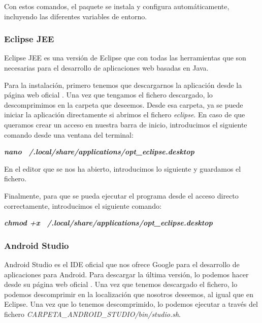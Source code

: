 Con estos comandos, el paquete se instala y configura automáticamente, incluyendo las diferentes variables de entorno.

\subsubsection{Eclipse JEE}

Eclipse JEE es una versión de Eclipse que con todas las herramientas que son necesarias para el desarrollo de aplicaciones web basadas en Java.

Para la instalación, primero tenemos que descargarnos la aplicación desde la página web oficial \cite{eclipse:install}. Una vez que tengamos el fichero descargado, lo descomprimimos en la carpeta que deseemos. Desde esa carpeta, ya se puede iniciar la aplicación directamente si abrimos el fichero \textit{eclipse}. En caso de que queramos crear un acceso en nuestra barra de inicio, introducimos el siguiente comando desde una ventana del terminal:

\begin{center}
	\textbf{\textit{nano ~/.local/share/applications/opt\_eclipse.desktop}}
\end{center}

En el editor que se nos ha abierto, introducimos lo siguiente y guardamos el fichero.


Finalmente, para que se pueda ejecutar el programa desde el acceso directo correctamente, introducimos el siguiente comando:

\begin{center}
	\textbf{\textit{chmod +x ~/.local/share/applications/opt\_eclipse.desktop}}
\end{center}

\subsubsection{Android Studio}

Android Studio es el IDE oficial que nos ofrece Google para el desarrollo de aplicaciones para Android. Para descargar la última versión, lo podemos hacer desde su página web oficial \cite{androidstudio:install}. Una vez que tenemos descargado el fichero, lo podemos descomprimir en la localización que nosotros deseemos, al igual que en Eclipse. Una vez que lo tenemos descomprimido, lo podemos ejecutar a través del fichero \textit{CARPETA\_ANDROID\_STUDIO/bin/studio.sh}.

